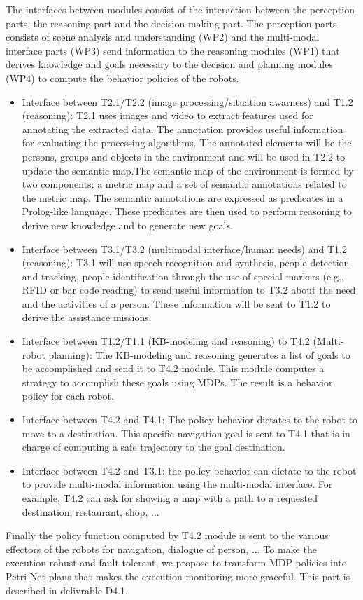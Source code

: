 \documentclass{article}
\begin{document}
The interfaces between modules consist of the interaction between the perception parts, the reasoning part and the decision-making part. The perception parts consists of scene analysis and understanding (WP2) and the multi-modal interface parts (WP3) send information to the reasoning modules (WP1) that derives knowledge and goals necessary to the decision and planning modules (WP4) to compute the behavior policies of the robots. 
\begin{itemize}
\item Interface between T2.1/T2.2 (image processing/situation awarness) and T1.2 (reasoning): T2.1 uses images and video to extract features used for annotating the extracted data. The annotation provides useful information for evaluating the processing algorithms. The annotated elements will be the persons, groups and objects in the environment and will be used  in T2.2 to update the semantic map.The semantic map of the environment is formed by two components: a metric map and a set of semantic annotations related to the metric map. The semantic annotations are expressed as predicates in a Prolog-like language. These predicates are then used to perform reasoning to derive new knowledge and to generate new goals.
\item Interface between T3.1/T3.2 (multimodal interface/human needs) and T1.2 (reasoning): T3.1 will use speech recognition and synthesis, people detection and tracking, people identification through the use of special markers (e.g., RFID or bar code reading) to send useful information to T3.2 about the need and the activities of a person. These information will be sent to T1.2 to derive the assistance missions. 
\item Interface between T1.2/T1.1 (KB-modeling and reasoning) to T4.2 (Multi-robot planning): The KB-modeling and reasoning generates a list of goals to be accomplished and send it to T4.2 module. This module computes a strategy to accomplish these goals using MDPs. The result is a behavior policy for each robot. 
\item Interface between T4.2 and T4.1: The policy behavior dictates to the robot to move to a destination. This specific navigation goal is sent to T4.1 that is in charge of computing a safe trajectory to the goal destination. 
\item Interface between T4.2 and T3.1: the policy behavior can dictate to the robot to provide multi-modal information using the multi-modal interface. For example, T4.2 can ask for showing a map with a path to a requested destination, restaurant, shop, ...
\end{itemize}
 Finally the policy function computed by T4.2 module is sent to the various effectors of the robots for navigation, dialogue of person, ... To make the execution robust and fault-tolerant, we propose to transform MDP policies into Petri-Net plans that makes the execution monitoring more graceful. This part is described in delivrable D4.1.
\end{document}
